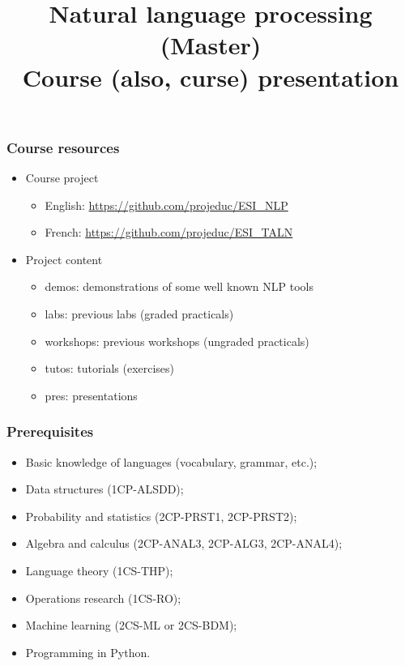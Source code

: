 \documentclass{beamer}
\title[ESI - NLP\_master: Presentation] %
{Natural language processing (Master)\\Course (also, curse) presentation}
\begin{document}
 
 
 \begin{frame}
 	\frametitle{Course resources}
 	
 	\begin{itemize}
 		\item Course project
 		\begin{itemize}
 			\item English: \url{https://github.com/projeduc/ESI_NLP}
 			\item French: \url{https://github.com/projeduc/ESI_TALN}
 		\end{itemize}
 		\item Project content
 		\begin{itemize}
 			\item demos: demonstrations of some well known NLP tools 
 			\item labs: previous labs (graded practicals)
 			\item workshops: previous workshops (ungraded practicals)
 			\item tutos: tutorials (exercises) 
 			\item pres: presentations
 		\end{itemize}
 	\end{itemize}
 	
 \end{frame}

\begin{frame}
\frametitle{Prerequisites}

\begin{itemize}
	\item Basic knowledge of languages (vocabulary, grammar, etc.);
	\item Data structures (1CP-ALSDD);
	\item Probability and statistics (2CP-PRST1, 2CP-PRST2);
	\item Algebra and calculus (2CP-ANAL3, 2CP-ALG3, 2CP-ANAL4);
	\item Language theory (1CS-THP);
	\item Operations research (1CS-RO);
	\item Machine learning (2CS-ML or 2CS-BDM);
	\item Programming in Python.
\end{itemize}

\end{frame}
\end{document}
